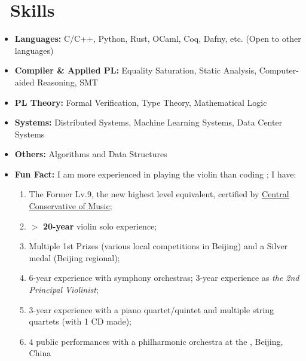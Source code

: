 \documentclass{resume}
\begin{document}
\section{\faCog\ Skills}
\begin{itemize}
    \item \textbf{Languages:} C/C++, Python, Rust, OCaml, Coq, Dafny, etc. (Open to other languages)
    \item \textbf{Compiler \& Applied PL:} Equality Saturation, Static Analysis, Computer-aided Reasoning, SMT
    \item \textbf{PL Theory:} Formal Verification, Type Theory, Mathematical Logic
    \item \textbf{Systems:} Distributed Systems, Machine Learning Systems, Data Center Systems
    \item \textbf{Others:} Algorithms and Data Structures
    \item \textbf{Fun Fact:} I am more experienced in playing the violin than coding \faMusic; I have:
    \begin{enumerate}
        \item The Former Lv.9, the new highest level equivalent, certified by \href{https://en.wikipedia.org/wiki/Central_Conservatory_of_Music}{{\color{blue} \ul{Central Conservative of Music}}};
        \item $>$ \textbf{20-year} violin solo experience;
        \item Multiple 1st Prizes (various local competitions in Beijing) and a Silver medal (Beijing regional);
        \item 6-year experience with symphony orchestras; 3-year experience as \textit{the 2nd Principal Violinist};
        \item 3-year experience with a piano quartet/quintet and multiple string quartets (with 1 CD made);
        \item $4$ public performances with a philharmonic orchestra at the \href{https://en.wikipedia.org/wiki/National_Centre_for_the_Performing_Arts_(China)}{}, Beijing, China
    \end{enumerate}
\end{itemize}
\end{document}
